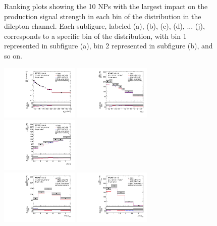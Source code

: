 \begin{figure}[ht]
  \caption{Ranking plots showing the 10 NPs with the largest impact on the \tty production signal strength in each bin of the \ptgamma distribution in the dilepton channel. Each subfigure, labeled (a), (b), (c), (d), ... (j), corresponds to a specific bin of the \ptgamma distribution, with bin 1 represented in subfigure (a), bin 2 represented in subfigure (b), and so on.}
  \label{fig:ranking_dilep_prod}
\end{figure}
\FloatBarrier

\begin{figure}[ht]
  \centering
  \includegraphics[width=0.33\textwidth]{figures/diff_xsec/absolute-unfolded-distributions/tty_prod_ljet/SL_tty_prod_pt_unfolded_absolute.pdf}%
  \includegraphics[width=0.33\textwidth]{figures/diff_xsec/absolute-unfolded-distributions/tty_prod_ljet/SL_tty_prod_eta_unfolded_absolute.pdf}%
  \includegraphics[width=0.33\textwidth]{figures/diff_xsec/absolute-unfolded-distributions/tty_prod_ljet/SL_tty_prod_drphl_unfolded_absolute.pdf}\\
  \includegraphics[width=0.33\textwidth]{figures/diff_xsec/absolute-unfolded-distributions/tty_prod_ljet/SL_tty_prod_drphb_unfolded_absolute.pdf}%
  \includegraphics[width=0.33\textwidth]{figures/diff_xsec/absolute-unfolded-distributions/tty_prod_ljet/SL_tty_prod_drlj_unfolded_absolute.pdf}%

\end{figure}
